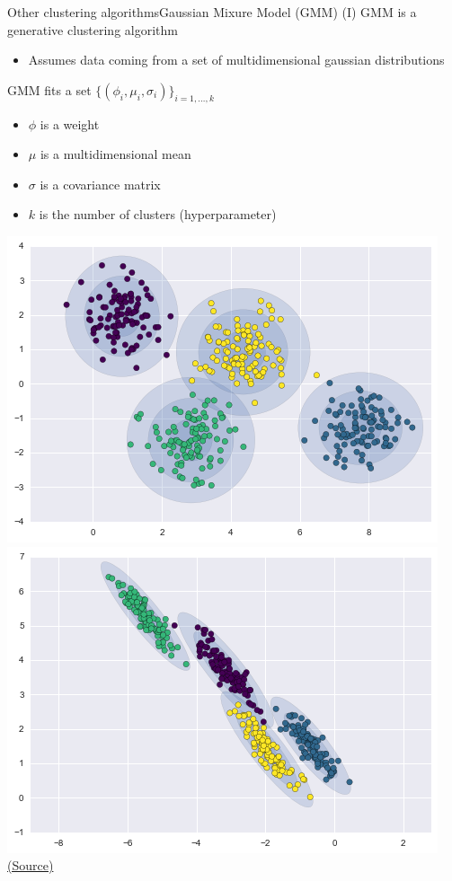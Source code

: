 \documentclass[10pt,compress]{beamer} %
\begin{document}
\begin{frame}{Other clustering algorithms}{Gaussian Mixure Model (GMM) (I)}
	GMM is a generative clustering algorithm
	\begin{itemize}
		\item Assumes data coming from a set of multidimensional gaussian distributions
	\end{itemize}

    GMM fits a set $\{(\phi_i, \mu_i, \sigma_i)\}_{i=1,\dots, k}$
	\begin{itemize}
			\item $\phi$ is a weight
			\item $\mu$ is a multidimensional mean
			\item $\sigma$ is a covariance matrix
            \item $k$ is the number of clusters (hyperparameter)
	\end{itemize}

	\bigskip
	\centering \includegraphics[width=0.31\linewidth]{figs/gmm2.png}
	\includegraphics[width=0.31\linewidth]{figs/gmm3.png}\\
	\scriptsize\href{https://jakevdp.github.io/PythonDataScienceHandbook/05.12-gaussian-mixtures.html}{(Source)}
\end{frame}
\end{document}
